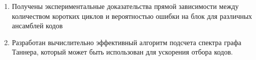 \startconclusionpage

\begin{enumerate}
	\item Получены экспериментальные доказательства прямой зависимости между количеством коротких циклов и вероятностью ошибки на блок для различных ансамблей кодов
	\item Разработан вычислительно эффективный алгоритм подсчета спектра графа Таннера, который может быть использован для ускорения отбора кодов.
\end{enumerate}
